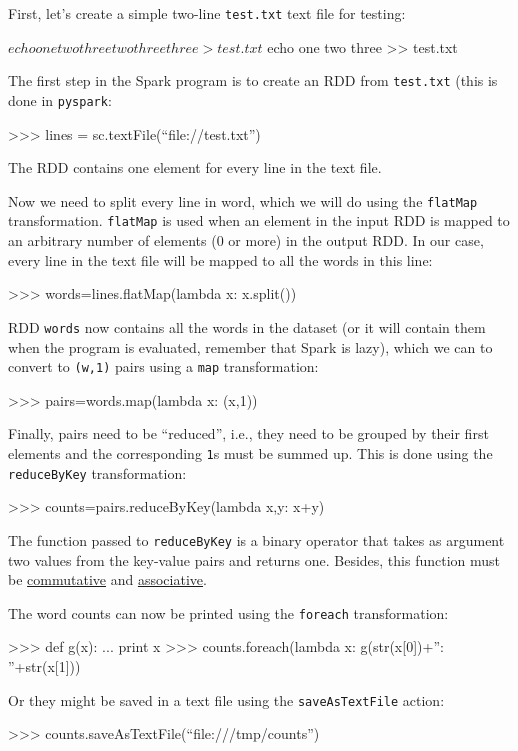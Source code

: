 \documentclass[11pt]{article}
\begin{document}
First, let's create a simple two-line \texttt{test.txt} text file for testing:
\begin{cli}
  $ echo one two three two three three > test.txt
  $ echo one two three >> test.txt
\end{cli}

The first step in the Spark program is to create an RDD from
\texttt{test.txt} (this is done in \texttt{pyspark}:
\begin{cli}
  >>> lines = sc.textFile(``file://test.txt'')
\end{cli}
The RDD contains one element for every line in the text file. 

Now we need to split every line in word, which we will do using the
\texttt{flatMap} transformation.  \texttt{flatMap} is used when an
element in the input RDD is mapped to an arbitrary number of elements
(0 or more) in the output RDD. In our case, every line in the text
file will be mapped to all the words in this line:
\begin{cli}
  >>> words=lines.flatMap(lambda x: x.split())
\end{cli}
RDD \texttt{words} now contains all the words in the dataset (or it
will contain them when the program is evaluated, remember that Spark
is lazy), which we can to convert to \texttt{(w,1)} pairs using a
\texttt{map} transformation:
\begin{cli}
  >>> pairs=words.map(lambda x: (x,1))
\end{cli}
Finally, pairs need to be ``reduced'', i.e., they need to be grouped
by their first elements and the corresponding \texttt{1}s must be
summed up. This is done using the \texttt{reduceByKey} transformation:
\begin{cli}
  >>> counts=pairs.reduceByKey(lambda x,y: x+y)
\end{cli}
The function passed to \texttt{reduceByKey} is a binary
operator that takes as argument two values from the key-value pairs
and returns one. Besides, this function must be
\underline{commutative} and \underline{associative}. 

The word counts can now be printed using the \texttt{foreach} transformation:
\begin{cli}
  >>> def g(x):
  ...   print x
  >>> counts.foreach(lambda x: g(str(x[0])+'': ''+str(x[1]))
\end{cli}
Or they might be saved in a text file using the \texttt{saveAsTextFile} action:
\begin{cli}
  >>> counts.saveAsTextFile(``file:///tmp/counts'')
\end{cli}
\end{document}

